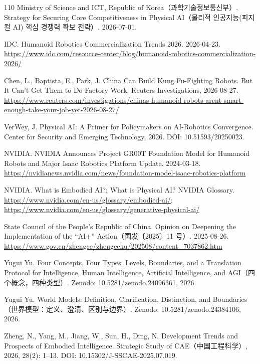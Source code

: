 \documentclass[10pt]{article}
\begin{document}
\begin{thebibliography}{110}
Ministry of Science and ICT, Republic of Korea（{\hangulfont 과학기술정보통신부}）. Strategy for Securing Core Competitiveness in Physical AI（{\hangulfont 물리적 인공지능(피지컬 AI) 핵심 경쟁력 확보 전략}）. 2026-07-01.

IDC. Humanoid Robotics Commercialization Trends 2026. 2026-04-23. \url{https://www.idc.com/resource-center/blog/humanoid-robotics-commercialization-2026/}

Chen, L., Baptista, E., Park, J. China Can Build Kung Fu-Fighting Robots. But It Can't Get Them to Do Factory Work. Reuters Investigations, 2026-08-27. \url{https://www.reuters.com/investigations/chinas-humanoid-robots-arent-smart-enough-take-your-job-yet-2026-08-27/}

VerWey, J. Physical AI: A Primer for Policymakers on AI-Robotics Convergence. Center for Security and Emerging Technology, 2026. DOI: 10.51593/20250023.

NVIDIA. NVIDIA Announces Project GR00T Foundation Model for Humanoid Robots and Major Isaac Robotics Platform Update. 2024-03-18. \url{https://nvidianews.nvidia.com/news/foundation-model-isaac-robotics-platform}

NVIDIA. What is Embodied AI?; What is Physical AI? NVIDIA Glossary. \url{https://www.nvidia.com/en-us/glossary/embodied-ai/}; \url{https://www.nvidia.com/en-us/glossary/generative-physical-ai/}

State Council of the People's Republic of China. Opinion on Deepening the Implementation of the ``AI+'' Action（国发〔2025〕11 号）. 2025-08-26. \url{https://www.gov.cn/zhengce/zhengceku/202508/content_7037862.htm}

Yugui Yu. Four Concepts, Four Types: Levels, Boundaries, and a Translation Protocol for Intelligence, Human Intelligence, Artificial Intelligence, and AGI（四个概念，四种类型）. Zenodo: 10.5281/zenodo.24096361, 2026.

Yugui Yu. World Models: Definition, Clarification, Distinction, and Boundaries（世界模型：定义、澄清、区别与边界）. Zenodo: 10.5281/zenodo.24384106, 2026.

Zheng, N., Yang, M., Jiang, W., Sun, H., Ding, N. Development Trends and Prospects of Embodied Intelligence. Strategic Study of CAE（中国工程科学）, 2026, 28(2): 1–13. DOI: 10.15302/J-SSCAE-2025.07.019.


\end{thebibliography}
\end{document}
